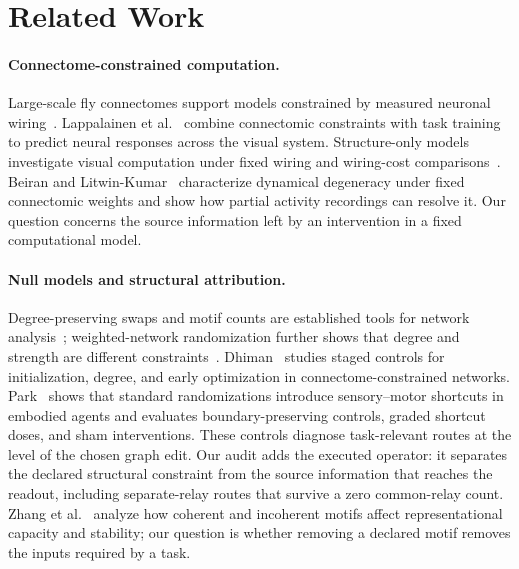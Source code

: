 \section{Related Work}
\label{sec:related}

\paragraph{Connectome-constrained computation.}
Large-scale fly connectomes support models constrained by measured neuronal
wiring~\cite{dorkenwald2024,malecns2026}. Lappalainen et
al.~\cite{lappalainen2024} combine connectomic constraints with task training
to predict neural responses across the visual system. Structure-only models
investigate visual computation under fixed wiring and wiring-cost
comparisons~\cite{structure2026}. Beiran and Litwin-Kumar~\cite{beiran2025} characterize dynamical
degeneracy under fixed connectomic weights and show how partial activity
recordings can resolve it. Our question concerns the source information
left by an intervention in a fixed computational model.

\paragraph{Null models and structural attribution.}
Degree-preserving swaps and motif counts are established tools for network
analysis~\cite{maslov2002,milo2002}; weighted-network randomization further
shows that degree and strength are different constraints~\cite{milisav2025}.
Dhiman~\cite{dhiman2026} studies staged controls for initialization, degree,
and early optimization in connectome-constrained networks. Park~\cite{park2026}
shows that standard randomizations introduce sensory--motor shortcuts in
embodied agents and evaluates boundary-preserving controls, graded shortcut
doses, and sham interventions. These controls diagnose task-relevant routes
at the level of the chosen graph edit. Our audit adds the executed operator:
it separates the declared structural constraint from the source information
that reaches the readout, including separate-relay routes that survive a
zero common-relay count.
Zhang et al.~\cite{zhang2025motifs} analyze how coherent and incoherent
motifs affect representational capacity and stability; our question is
whether removing a declared motif removes the inputs required by a task.

